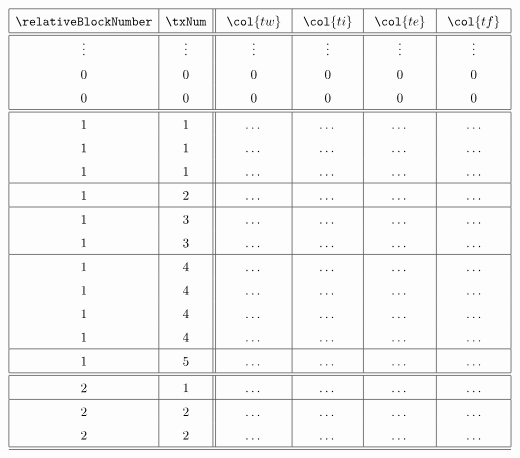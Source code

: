 \begin{figure}
	\centering
	\[
		\renewcommand{\arraystretch}{1.5}
		\begin{array}{|c|c||c|c|c|c|}
			\hline
			\relativeBlockNumber & \txNum & ~ \col{tw} ~ & ~ \col{ti} ~ & ~ \col{te} ~ & ~ \col{tf} ~ \\ \hline\hline
			\vdots               & \vdots & \vdots       & \vdots       & \vdots       & \vdots       \\
			0                    & 0      & 0            & 0            & 0            & 0            \\
			0                    & 0      & 0            & 0            & 0            & 0            \\ \hline\hline
			1                    & 1      & \dots        & \dots        & \dots        & \dots        \\
			1                    & 1      & \dots        & \dots        & \dots        & \dots        \\
			1                    & 1      & \dots        & \dots        & \dots        & \dots        \\ \hline
			1                    & 2      & \dots        & \dots        & \dots        & \dots        \\ \hline
			1                    & 3      & \dots        & \dots        & \dots        & \dots        \\
			1                    & 3      & \dots        & \dots        & \dots        & \dots        \\ \hline
			1                    & 4      & \dots        & \dots        & \dots        & \dots        \\
			1                    & 4      & \dots        & \dots        & \dots        & \dots        \\
			1                    & 4      & \dots        & \dots        & \dots        & \dots        \\
			1                    & 4      & \dots        & \dots        & \dots        & \dots        \\ \hline
			1                    & 5      & \dots        & \dots        & \dots        & \dots        \\ \hline\hline
			2                    & 1      & \dots        & \dots        & \dots        & \dots        \\ \hline
			2                    & 2      & \dots        & \dots        & \dots        & \dots        \\
			2                    & 2      & \dots        & \dots        & \dots        & \dots        \\ \hline\hline

\end{array}\]
\end{figure}
